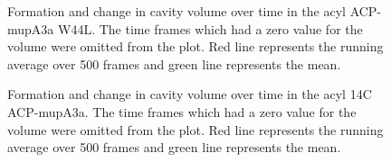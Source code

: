 \begin{singlespacing}
		\setlength\fboxsep{5pt}
		\setlength\fboxrule{1.5pt}
		\begin{figure}[htbp]
		\centering
		\caption[Formation and change in cavity volume over time in the acyl ACP-mupA3a W44L.]{Formation and change in cavity volume over time in the acyl ACP-mupA3a W44L. The time frames which had a zero value for the volume were omitted from the plot. Red line represents the running average over 500 frames and green line represents the mean.}
		\label{fig:CavityVolumeACPSPMMutant_nonzero}
		\end{figure}		

		\setlength\fboxsep{5pt}
		\setlength\fboxrule{1.5pt}
		\begin{figure}[htbp]
		\centering
		\caption[Formation and change in cavity volume over time in the acyl 14C ACP-mupA3a.]{Formation and change in cavity volume over time in the acyl 14C ACP-mupA3a. The time frames which had a zero value for the volume were omitted from the plot. Red line represents the running average over 500 frames and green line represents the mean.}
		\label{fig:CavityVolumeACPSPD_nonzero}
		\end{figure}
		

\end{singlespacing}
